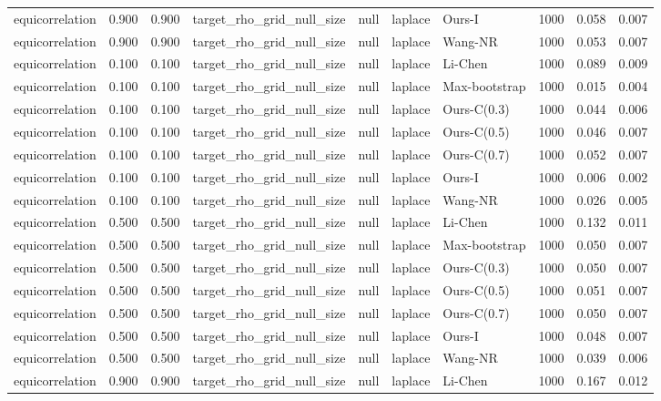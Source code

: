 \begin{tabular}{lrrllllrrr}
equicorrelation & 0.900 & 0.900 & target\_rho\_grid\_null\_size & null & laplace & Ours-I & 1000 & 0.058 & 0.007 \\
equicorrelation & 0.900 & 0.900 & target\_rho\_grid\_null\_size & null & laplace & Wang-NR & 1000 & 0.053 & 0.007 \\
equicorrelation & 0.100 & 0.100 & target\_rho\_grid\_null\_size & null & laplace & Li-Chen & 1000 & 0.089 & 0.009 \\
equicorrelation & 0.100 & 0.100 & target\_rho\_grid\_null\_size & null & laplace & Max-bootstrap & 1000 & 0.015 & 0.004 \\
equicorrelation & 0.100 & 0.100 & target\_rho\_grid\_null\_size & null & laplace & Ours-C(0.3) & 1000 & 0.044 & 0.006 \\
equicorrelation & 0.100 & 0.100 & target\_rho\_grid\_null\_size & null & laplace & Ours-C(0.5) & 1000 & 0.046 & 0.007 \\
equicorrelation & 0.100 & 0.100 & target\_rho\_grid\_null\_size & null & laplace & Ours-C(0.7) & 1000 & 0.052 & 0.007 \\
equicorrelation & 0.100 & 0.100 & target\_rho\_grid\_null\_size & null & laplace & Ours-I & 1000 & 0.006 & 0.002 \\
equicorrelation & 0.100 & 0.100 & target\_rho\_grid\_null\_size & null & laplace & Wang-NR & 1000 & 0.026 & 0.005 \\
equicorrelation & 0.500 & 0.500 & target\_rho\_grid\_null\_size & null & laplace & Li-Chen & 1000 & 0.132 & 0.011 \\
equicorrelation & 0.500 & 0.500 & target\_rho\_grid\_null\_size & null & laplace & Max-bootstrap & 1000 & 0.050 & 0.007 \\
equicorrelation & 0.500 & 0.500 & target\_rho\_grid\_null\_size & null & laplace & Ours-C(0.3) & 1000 & 0.050 & 0.007 \\
equicorrelation & 0.500 & 0.500 & target\_rho\_grid\_null\_size & null & laplace & Ours-C(0.5) & 1000 & 0.051 & 0.007 \\
equicorrelation & 0.500 & 0.500 & target\_rho\_grid\_null\_size & null & laplace & Ours-C(0.7) & 1000 & 0.050 & 0.007 \\
equicorrelation & 0.500 & 0.500 & target\_rho\_grid\_null\_size & null & laplace & Ours-I & 1000 & 0.048 & 0.007 \\
equicorrelation & 0.500 & 0.500 & target\_rho\_grid\_null\_size & null & laplace & Wang-NR & 1000 & 0.039 & 0.006 \\
equicorrelation & 0.900 & 0.900 & target\_rho\_grid\_null\_size & null & laplace & Li-Chen & 1000 & 0.167 & 0.012 \\

\end{tabular}
